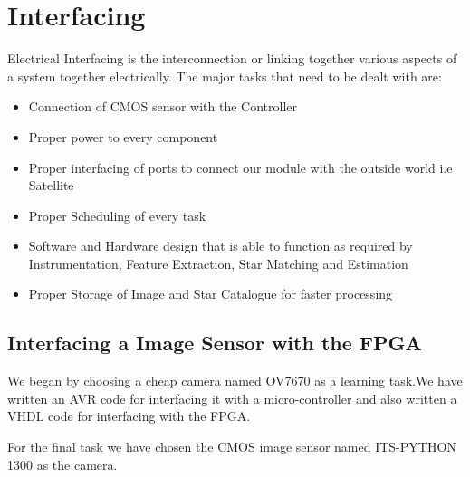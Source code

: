 \documentclass[../../main.tex]{subfiles}
\begin{document}
\section{Interfacing}
\thispagestyle{fancy}











Electrical Interfacing is the interconnection or linking together various aspects of a system together electrically. The major tasks that need to be dealt with are:

\begin{itemize}
    \item {Connection of CMOS sensor with the Controller}
    \item {Proper power to every component}
    \item {Proper interfacing of ports to connect our module with the outside world i.e Satellite}
    \item {Proper Scheduling of every task}
    \item {Software and Hardware design that is able to function as required by Instrumentation, Feature Extraction, Star Matching and Estimation}
    \item {Proper Storage of Image and Star Catalogue for faster processing}
\end{itemize}


\subsection{Interfacing a Image Sensor with the FPGA}
We began by choosing a cheap camera named OV7670 as a learning task.We have written an AVR code for interfacing it with a micro-controller and also written a VHDL code for interfacing with the FPGA.

For the final task we have chosen the CMOS image sensor named ITS-PYTHON 1300 as the camera.
\end{document}
